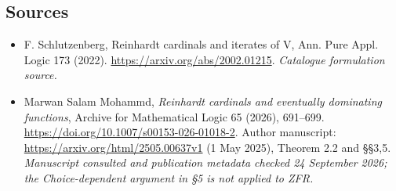\documentclass[11pt]{article}
\begin{document}
\subsection{Sources}
\begin{itemize}\raggedright
\item[\textnormal{[S1]}]\hypertarget{source:152:1}{} F. Schlutzenberg, Reinhardt cardinals and iterates of V, Ann. Pure Appl. Logic 173 (2022).
\url{https://arxiv.org/abs/2002.01215}.
{\small\textit{Catalogue formulation source.}}
\item[\textnormal{[E1]}]\hypertarget{extra:152:1}{} Marwan Salam Mohammd,
\emph{Reinhardt cardinals and eventually dominating functions},
Archive for Mathematical Logic 65 (2026), 691--699.
\url{https://doi.org/10.1007/s00153-026-01018-2}.
Author manuscript: \url{https://arxiv.org/html/2505.00637v1} (1 May 2025),
Theorem 2.2 and \S\S3,5.
{\small\textit{Manuscript consulted and publication metadata checked
24 September 2026; the Choice-dependent argument in \S5 is not applied to ZFR.}}
\end{itemize}
\end{document}
